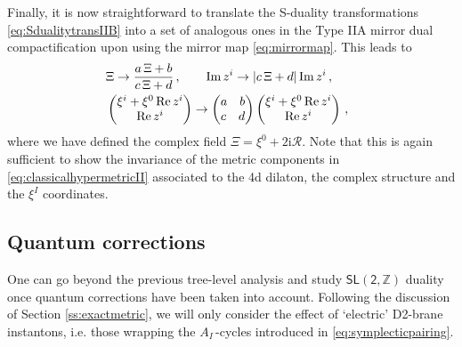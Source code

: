 Finally, it is now straightforward to translate the S-duality transformations \eqref{eq:SdualitytransIIB} into a set of analogous ones in the Type IIA mirror dual compactification upon using the mirror map \eqref{eq:mirrormap}. This leads to
%
\begin{align}\label{eq:SdualitytransIIA}
	&\Xi \rightarrow \frac{a\, \Xi + b}{c\, \Xi+d}\,,\qquad
	\text{Im}\, z^i \rightarrow |c\, \Xi+d|\, \text{Im}\, z^i \,,\qquad \notag\\
	&\begin{pmatrix}
		\xi^i + \xi^0\, \text{Re}\, z^i\\ \text{Re}\, z^i
	\end{pmatrix}
	\rightarrow
	\begin{pmatrix}
		a \quad  b\\c \quad  d
	\end{pmatrix}
	\begin{pmatrix}
		\xi^i + \xi^0\, \text{Re}\, z^i\\ \text{Re}\, z^i
	\end{pmatrix}\, , 
\end{align}
%
where we have defined the complex field $\Xi= \xi^0 + 2 \text{i} \mathcal{R}$. Note that this is again sufficient to show the invariance of the metric components in \eqref{eq:classicalhypermetricII} associated to the 4d dilaton, the complex structure and the $\xi^I$ coordinates.
	
\subsection{Quantum corrections}
	
One can go beyond the previous tree-level analysis and study $\mathsf{SL(2,\mathbb{Z})}$ duality once quantum corrections have been taken into account. Following the discussion of Section \ref{ss:exactmetric}, we will only consider the effect of `electric' D2-brane instantons, i.e. those wrapping the $A_I$\,-cycles introduced in \eqref{eq:symplecticpairing}.  
	
